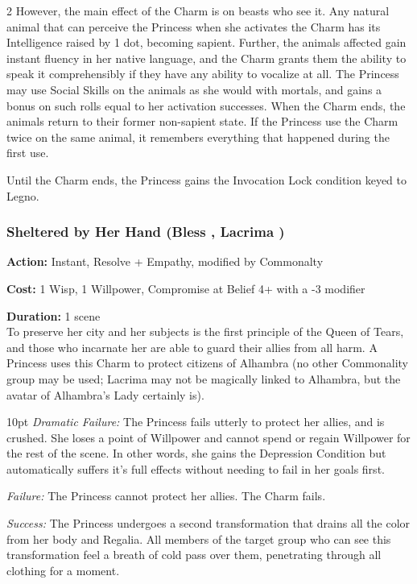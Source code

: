 \begin{multicols}{2}
However, the main effect of the Charm is on beasts who see it. Any natural animal that can perceive the Princess when she activates the Charm has its Intelligence raised by 1 dot, becoming sapient. Further, the animals affected gain instant fluency in her native language, and the Charm grants them the ability to speak it comprehensibly if they have any ability to vocalize at all. The Princess may use Social Skills on the animals as she would with mortals, and gains a bonus on such rolls equal to her activation successes. When the Charm ends, the animals return to their former non-sapient state. If the Princess use the Charm twice on the same animal, it remembers everything that happened during the first use.

Until the Charm ends, the Princess gains the Invocation Lock condition keyed to Legno.

\subsubsection*{Sheltered by Her Hand (Bless \textbullet\textbullet\textbullet\textbullet\textbullet, Lacrima \textbullet\textbullet\textbullet\textbullet)}

\noindent \textbf{Action:} Instant, Resolve + Empathy, modified by Commonalty

\noindent \textbf{Cost:} 1 Wisp, 1 Willpower, Compromise at Belief 4+ with a -3 modifier

\noindent \textbf{Duration:} 1 scene \\

\noindent To preserve her city and her subjects is the first principle of the Queen of Tears, and those who incarnate her are able to guard their allies from all harm. A Princess uses this Charm to protect citizens of Alhambra (no other Commonality group may be used; Lacrima may not be magically linked to Alhambra, but the avatar of Alhambra's Lady certainly is).

\begin{myindentpar}{10pt}    \emph{Dramatic Failure:} The Princess fails utterly to protect her allies, and is crushed. She loses a point of Willpower and cannot spend or regain Willpower for the rest of the scene. In other words, she gains the Depression Condition but automatically suffers it's full effects without needing to fail in her goals first. 

    \emph{Failure:} The Princess cannot protect her allies. The Charm fails.

    \emph{Success:} The Princess undergoes a second transformation that drains all the color from her body and Regalia. All members of the target group who can see this transformation feel a breath of cold pass over them, penetrating through all clothing for a moment. 
    

\end{myindentpar}
\end{multicols}
